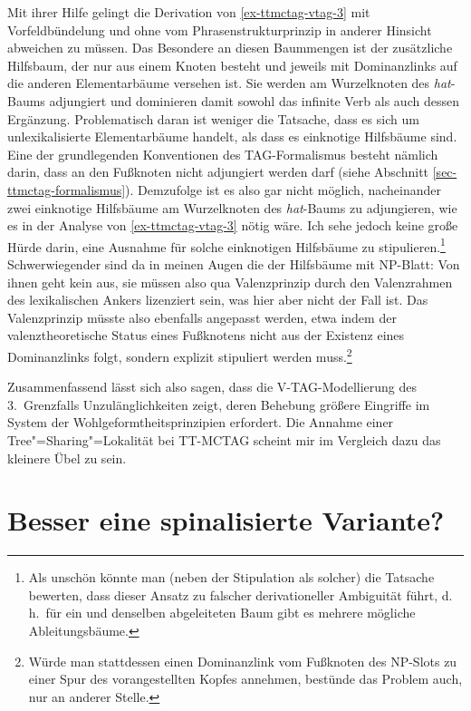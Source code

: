 Mit ihrer Hilfe gelingt die Derivation von \ref{ex-ttmctag-vtag-3} mit Vorfeldbündelung und ohne vom Phrasenstrukturprinzip in anderer Hinsicht abweichen zu müssen. Das Besondere an diesen Baummengen ist der zusätzliche Hilfsbaum, der nur aus einem Knoten besteht und jeweils mit Dominanzlinks auf die anderen Elementarbäume versehen ist. Sie werden am Wurzelknoten des {\it hat}-Baums adjungiert und dominieren damit sowohl das infinite Verb als auch dessen Ergänzung. Problematisch daran ist weniger die Tatsache, dass es sich um unlexikalisierte Elementarbäume handelt, als dass es einknotige Hilfsbäume sind. Eine der grundlegenden Konventionen des TAG-Formalismus besteht nämlich darin, dass an den Fu\ss knoten nicht adjungiert werden darf (siehe Abschnitt \ref{sec-ttmctag-formalismus}). Demzufolge ist es also gar nicht möglich, nacheinander zwei einknotige Hilfsbäume am Wurzelknoten des {\it hat}-Baums zu adjungieren, wie es in der Analyse von \ref{ex-ttmctag-vtag-3} nötig wäre. Ich sehe jedoch keine große Hürde darin, eine Ausnahme für solche einknotigen Hilfsbäume zu stipulieren.\footnote{Als unschön könnte man (neben der Stipulation als solcher) die Tatsache bewerten, dass dieser Ansatz zu falscher derivationeller Ambiguität führt, d.\,h.\ für ein und denselben abgeleiteten Baum gibt es mehrere mögliche Ableitungsbäume.} Schwerwiegender sind da in meinen Augen die  der Hilfsbäume mit NP-Blatt: Von ihnen geht kein  aus, sie müssen also qua Valenzprinzip durch den Valenzrahmen des lexikalischen Ankers lizenziert sein, was hier aber nicht der Fall ist. Das Valenzprinzip müsste also ebenfalls angepasst werden, etwa indem der valenztheoretische Status eines Fu\ss knotens nicht aus der Existenz eines Dominanzlinks folgt, sondern explizit stipuliert werden muss.\footnote{Würde man stattdessen einen Dominanzlink vom Fußknoten des NP-Slots zu einer Spur des vorangestellten Kopfes annehmen, bestünde das Problem auch, nur an anderer Stelle.}

Zusammenfassend lässt sich also sagen, dass die V-TAG-Modellierung des 3.\ Grenzfalls Unzulänglichkeiten zeigt, deren Behebung grö\ss ere Eingriffe im System der Wohlgeformtheitsprinzipien erfordert. Die Annahme einer Tree"=Sharing"=Lokalität bei TT-MCTAG scheint mir im Vergleich dazu das kleinere Übel zu sein.


\section{Besser eine spinalisierte Variante?}\label{sec-ttmctag-spinal}

